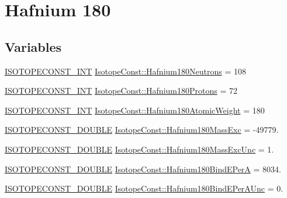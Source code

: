 \hypertarget{group___isotope_const-_hafnium-_hf180}{}\section{Hafnium 180}
\label{group___isotope_const-_hafnium-_hf180}
\subsection*{Variables}
\begin{DoxyCompactItemize}
\item 
\mbox{\hyperlink{group___isotope_const-_macros_ga5f18360b3e99483a35c32d789e62621c}{I\+S\+O\+T\+O\+P\+E\+C\+O\+N\+S\+T\+\_\+\+I\+NT}} \mbox{\hyperlink{group___isotope_const-_hafnium-_hf180_ga8528303f3d87fa0a5ccc6e43c4bfbafa}{Isotope\+Const\+::\+Hafnium180\+Neutrons}} = 108
\item 
\mbox{\hyperlink{group___isotope_const-_macros_ga5f18360b3e99483a35c32d789e62621c}{I\+S\+O\+T\+O\+P\+E\+C\+O\+N\+S\+T\+\_\+\+I\+NT}} \mbox{\hyperlink{group___isotope_const-_hafnium-_hf180_ga7c8d3727dd062390b370f9a8e7ae3890}{Isotope\+Const\+::\+Hafnium180\+Protons}} = 72
\item 
\mbox{\hyperlink{group___isotope_const-_macros_ga5f18360b3e99483a35c32d789e62621c}{I\+S\+O\+T\+O\+P\+E\+C\+O\+N\+S\+T\+\_\+\+I\+NT}} \mbox{\hyperlink{group___isotope_const-_hafnium-_hf180_ga313a0a02863aef8d794c3353d73aca1a}{Isotope\+Const\+::\+Hafnium180\+Atomic\+Weight}} = 180
\item 
\mbox{\hyperlink{group___isotope_const-_macros_ga8f45a7272ce02c0b4c65c44636ed719a}{I\+S\+O\+T\+O\+P\+E\+C\+O\+N\+S\+T\+\_\+\+D\+O\+U\+B\+LE}} \mbox{\hyperlink{group___isotope_const-_hafnium-_hf180_ga44e7ee1cf5d13b74932479aa06091161}{Isotope\+Const\+::\+Hafnium180\+Mass\+Exc}} = -\/49779.
\item 
\mbox{\hyperlink{group___isotope_const-_macros_ga8f45a7272ce02c0b4c65c44636ed719a}{I\+S\+O\+T\+O\+P\+E\+C\+O\+N\+S\+T\+\_\+\+D\+O\+U\+B\+LE}} \mbox{\hyperlink{group___isotope_const-_hafnium-_hf180_ga2f2ab5b9730d5cc12aef4d0c63c690c4}{Isotope\+Const\+::\+Hafnium180\+Mass\+Exc\+Unc}} = 1.
\item 
\mbox{\hyperlink{group___isotope_const-_macros_ga8f45a7272ce02c0b4c65c44636ed719a}{I\+S\+O\+T\+O\+P\+E\+C\+O\+N\+S\+T\+\_\+\+D\+O\+U\+B\+LE}} \mbox{\hyperlink{group___isotope_const-_hafnium-_hf180_ga7e222c9f539568c92e9b43df2de801fd}{Isotope\+Const\+::\+Hafnium180\+Bind\+E\+PerA}} = 8034.
\item 
\mbox{\hyperlink{group___isotope_const-_macros_ga8f45a7272ce02c0b4c65c44636ed719a}{I\+S\+O\+T\+O\+P\+E\+C\+O\+N\+S\+T\+\_\+\+D\+O\+U\+B\+LE}} \mbox{\hyperlink{group___isotope_const-_hafnium-_hf180_ga04312d7d4b01957c09fa2b333c626b57}{Isotope\+Const\+::\+Hafnium180\+Bind\+E\+Per\+A\+Unc}} = 0.

\end{DoxyCompactItemize}
